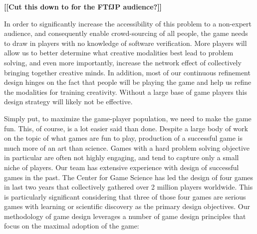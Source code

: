 \documentclass[preprint]{sig-alternate}
\newcommand{\todo}[1]{{\color{red}\bfseries [[#1]]}}
\begin{document}
\todo{Cut this down to for the FTfJP audience?}

In order to significantly increase the accessibility of this problem
to a non-expert audience, and consequently enable crowd-sourcing of
all people, the game needs to draw in players with no knowledge of
software verification.  More players will allow us to better determine
what creative modalities best lead to problem solving, and even more
importantly, increase the network effect of collectively bringing
together creative minds. In addition, most of our continuous
refinement design hinges on the fact that people will be playing the
game and help us refine the modalities for training creativity.
Without a large base of game players this design strategy will likely
not be effective.

Simply put, to maximize the game-player population, we need to make
the game fun. This, of course, is a lot easier said than done. Despite
a large body of work on the topic of what games are fun to play,
production of a successful game is much more of an art than science.
Games with a hard problem solving objective in particular are often
not highly engaging, and tend to capture only a small niche of
players.  Our team has extensive experience with design of successful
games in the past.  The Center for Game Science has led the design of
four games in last two years that collectively gathered over 2 million
players worldwide.  This is particularly significant considering that
three of those four games are serious games with learning or
scientific discovery as the primary design objectives.  Our
methodology of game design leverages a number of game design
principles that focus on the maximal adoption of the game:
%
\end{document}
